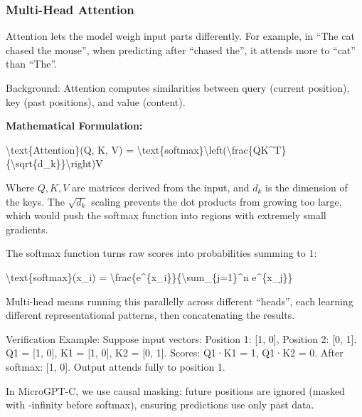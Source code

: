 \documentclass[
]{article}
\newenvironment{Shaded}{}{}
\newcommand{\NormalTok}[1]{#1}
\begin{document}
\subsubsection{Multi-Head Attention}\label{multi-head-attention}

Attention lets the model weigh input parts differently. For example, in
``The cat chased the mouse'', when predicting after ``chased the'', it
attends more to ``cat'' than ``The''.

Background: Attention computes similarities between query (current
position), key (past positions), and value (content).

\textbf{Mathematical Formulation:}

\begin{Shaded}
\begin{Highlighting}[]
\NormalTok{\textbackslash{}text\{Attention\}(Q, K, V) = \textbackslash{}text\{softmax\}\textbackslash{}left(\textbackslash{}frac\{QK\^{}T\}\{\textbackslash{}sqrt\{d\_k\}\}\textbackslash{}right)V}
\end{Highlighting}
\end{Shaded}

Where \(Q, K, V\) are matrices derived from the input, and \(d_k\) is
the dimension of the keys. The \(\sqrt{d_k}\) scaling prevents the dot
products from growing too large, which would push the softmax function
into regions with extremely small gradients.

The softmax function turns raw scores into probabilities summing to
\(1\):

\begin{Shaded}
\begin{Highlighting}[]
\NormalTok{\textbackslash{}text\{softmax\}(x\_i) = \textbackslash{}frac\{e\^{}\{x\_i\}\}\{\textbackslash{}sum\_\{j=1\}\^{}n e\^{}\{x\_j\}\}}
\end{Highlighting}
\end{Shaded}

Multi-head means running this parallelly across different ``heads'',
each learning different representational patterns, then concatenating
the results.

Verification Example: Suppose input vectors: Position 1: {[}1, 0{]},
Position 2: {[}0, 1{]}. Q1 = {[}1, 0{]}, K1 = {[}1, 0{]}, K2 = {[}0,
1{]}. Scores: Q1·K1 = 1, Q1·K2 = 0. After softmax: {[}1, 0{]}. Output
attends fully to position 1.

In MicroGPT-C, we use causal masking: future positions are ignored
(masked with -infinity before softmax), ensuring predictions use only
past data.
\end{document}
